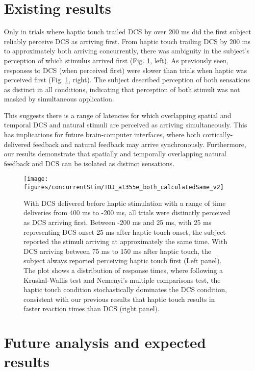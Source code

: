 \section{Existing results}
Only in trials where haptic touch trailed DCS by over 200 ms did the first subject reliably perceive DCS as arriving first. From haptic touch trailing DCS by 200 ms to approximately both arriving concurrently, there was ambiguity in the subject’s perception of which stimulus arrived first (Fig. \ref{fig:TOJresults}, left). As previously seen, responses to DCS (when perceived first) were slower than trials when haptic was perceived first (Fig. \ref{fig:TOJresults}, right). The subject described perception of both sensations as distinct in all conditions, indicating that perception of both stimuli was not masked by simultaneous application.

This suggests there is a range of latencies for which overlapping spatial and temporal DCS and natural stimuli are perceived as arriving simultaneously. This has implications for future brain-computer interfaces, where both cortically-delivered feedback and natural feedback may arrive synchronously. Furthermore, our results demonstrate that spatially and temporally overlapping natural feedback and DCS can be isolated as distinct sensations.

\begin{figure}[ht]
	\centering
	\texttt{[image: figures/concurrentStim/TOJ\_a1355e\_both\_calculatedSame\_v2]}
	\caption[Results of temporal order judgement task]{With DCS delivered before haptic stimulation with a range of time deliveries from 400 ms to -200 ms, all trials were distinctly perceived as DCS arriving first. Between -200 ms and 25 ms, with 25 ms representing DCS onset 25 ms after haptic touch onset, the subject reported the stimuli arriving at approximately the same time. With DCS arriving between 75 ms to 150 ms after haptic touch, the subject always reported perceiving haptic touch first (Left panel). The plot shows a distribution of response times, where following a Kruskal-Wallis test and Nemenyi’s multiple comparisons test, the haptic touch condition stochastically dominates the DCS condition, consistent with our previous results that haptic touch results in faster reaction times than DCS (right panel).}
	\label{fig:TOJresults}
\end{figure}

\section{Future analysis and expected results}


